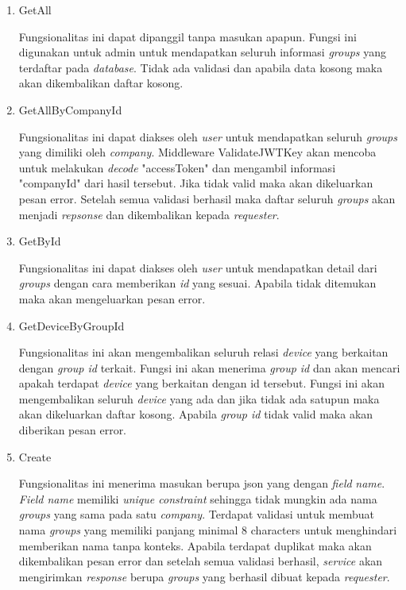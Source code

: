 \pagebreak

\begin{enumerate}
  \item GetAll

        Fungsionalitas ini dapat dipanggil tanpa masukan apapun. Fungsi ini digunakan untuk admin untuk mendapatkan seluruh informasi \textit{groups} yang terdaftar pada \textit{database}. Tidak ada validasi dan apabila data kosong maka akan dikembalikan daftar kosong.

  \item GetAllByCompanyId

        Fungsionalitas ini dapat diakses oleh \textit{user} untuk mendapatkan seluruh \textit{groups} yang dimiliki oleh \textit{company}. Middleware ValidateJWTKey akan mencoba untuk melakukan \textit{decode} "accessToken" dan mengambil informasi "companyId" dari hasil tersebut. Jika tidak valid maka akan dikeluarkan pesan error. Setelah semua validasi berhasil maka daftar seluruh \textit{groups} akan menjadi \textit{repsonse} dan dikembalikan kepada \textit{requester}.

  \item GetById

        Fungsionalitas ini dapat diakses oleh \textit{user} untuk mendapatkan detail dari \textit{groups} dengan cara memberikan \textit{id} yang sesuai. Apabila tidak ditemukan maka akan mengeluarkan pesan error.

  \item GetDeviceByGroupId


        Fungsionalitas ini akan mengembalikan seluruh relasi \textit{device} yang berkaitan dengan \textit{group id} terkait. Fungsi ini akan menerima \textit{group id} dan akan mencari apakah terdapat \textit{device} yang berkaitan dengan id tersebut. Fungsi ini akan mengembalikan seluruh \textit{device} yang ada dan jika tidak ada satupun maka akan dikeluarkan daftar kosong. Apabila \textit{group id} tidak valid maka akan diberikan pesan error.

  \item Create

        Fungsionalitas ini menerima masukan berupa json yang dengan \textit{field} \textit{name}. \textit{Field name} memiliki \textit{unique constraint} sehingga tidak mungkin ada nama \textit{groups} yang sama pada satu \textit{company}. Terdapat validasi untuk membuat nama \textit{groups} yang memiliki panjang minimal 8 characters untuk menghindari memberikan nama tanpa konteks. Apabila terdapat duplikat maka akan dikembalikan pesan error dan setelah semua validasi berhasil, \textit{service} akan mengirimkan \textit{response} berupa \textit{groups} yang berhasil dibuat kepada \textit{requester}.


\end{enumerate}
